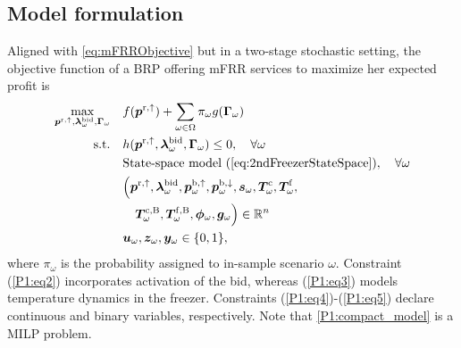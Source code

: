 \subsection{Model formulation}
Aligned with \eqref{eq:mFRRObjective} but in a two-stage stochastic setting, the objective function of a BRP offering mFRR services to maximize her expected profit is
%
\begin{subequations}\label{P1:compact_model}
    \begin{align}
        \underset{\bm{p}^{\rm{r},\uparrow}, \bm{\lambda}_{\omega}^{\text{bid}}, \bm{\Gamma}_{\omega}}{\textrm{max}} \quad & f(\bm{p}^{\rm{r},\uparrow}) + \sum_{\omega \in \Omega} \pi_{\omega} g(\bm{\Gamma}_{\omega}) \label{P1:eq1}
        \\
        \text{s.t.} \quad                                                                                                 & h(\bm{p}^{\rm{r},\uparrow}, \bm{\lambda}_{\omega}^{\text{bid}}, \bm{\Gamma}_{\omega}) \leq 0, \quad \forall{\omega}\label{P1:eq2}                                                                                        \\
        \quad                                                                                                             & \text{State-space model } (\ref{eq:2ndFreezerStateSpace}), \quad \forall{\omega} \label{P1:eq3}
        \\
        \quad                                                                                                             & \Bigl( \bm{p}^{\rm{r},\uparrow}, \bm{\lambda}_{\omega}^{\text{bid}}, \bm{p}_{\omega}^{\rm{b},\uparrow}, \bm{p}_{\omega}^{\rm{b},\downarrow}, \bm{s}_{\omega}, \bm{T}_{\omega}^{\rm{c}}, \bm{T}_{\omega}^{\rm{f}}, \notag \\ \quad & \quad \bm{T}_{\omega}^{\rm{c,B}}, \bm{T}_{\omega}^{\rm{f,B}}, \bm{\phi}_{\omega}, \bm{g}_{\omega} \Bigr) \in \mathbb{R}^{n}  \label{P1:eq4}
        \\
        \quad                                                                                                             & \bm{u}_{\omega}, \bm{z}_{\omega}, \bm{y}_{\omega} \in \{0,1\},  \label{P1:eq5}
    \end{align}
\end{subequations}
%
where $\pi_{\omega}$ is the probability assigned to in-sample scenario $\omega$. Constraint (\ref{P1:eq2}) incorporates activation of the bid, whereas (\ref{P1:eq3}) models temperature dynamics in the freezer. Constraints (\ref{P1:eq4})-(\ref{P1:eq5}) declare continuous and binary variables, respectively. Note that \eqref{P1:compact_model} is a MILP problem.


